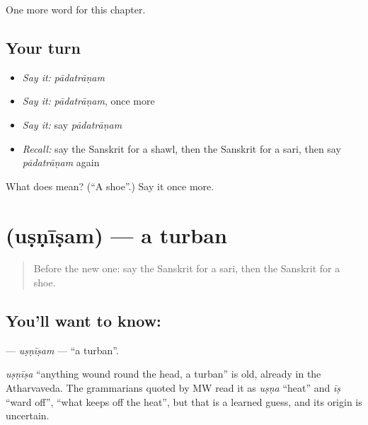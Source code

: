 \begin{grammarlens}[title={What you've built}]
One more word for this chapter.
\end{grammarlens}

\subsection*{Your turn}
\begin{itemize}
\raggedright
  \item \emph{Say it:} \emph{pādatrāṇam}
  \item \emph{Say it:} \emph{pādatrāṇam}, once more
  \item \emph{Say it:} say \emph{pādatrāṇam}
  \item \emph{Recall:} say the Sanskrit for a shawl, then the Sanskrit for a sari, then say \emph{pādatrāṇam} again
\end{itemize}

\begin{tcolorbox}[breakable,colback=teal!4,colframe=teal!35!black,title={Before you move on}]
What does  mean? (\textquotedblleft{}A shoe\textquotedblright{}.) Say it once more.
\end{tcolorbox}
\section[\texorpdfstring{\sk{उष्णीषम्} (uṣṇīṣam)}{उष्णीषम् (uṣṇīṣam)}]{ (uṣṇīṣam) — a turban}

\label{lesson:SA-C104-usnisam}



\begin{quote}
Before the new one: say the Sanskrit for a sari, then the Sanskrit for a shoe.
\end{quote}

\subsection*{You'll want to know: }
\textbf{} — \emph{uṣṇīṣam} — \textquotedblleft{}a turban\textquotedblright{}.

\begin{cousinweb}
\emph{uṣṇīṣa} \textquotedblleft{}anything wound round the head, a turban\textquotedblright{} is old, already in the Atharvaveda. The grammarians quoted by MW read it as \emph{uṣṇa} \textquotedblleft{}heat\textquotedblright{} and \emph{īṣ} \textquotedblleft{}ward off\textquotedblright{}, \textquotedblleft{}what keeps off the heat\textquotedblright{}, but that is a learned guess, and its origin is uncertain.
\end{cousinweb}

